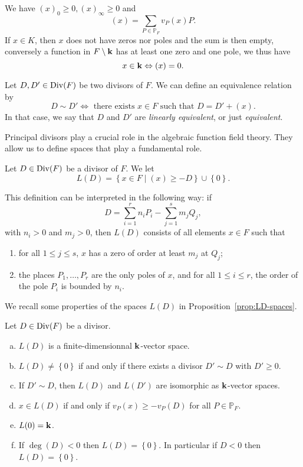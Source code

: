 We have $(x)_0\geq0, (x)_\infty\geq0$ and
\[
  (x) = \sum_{P\in\mathbb{P}_F}v_P(x)P.
\]
If $x\in K$, then $x$ does not have zeros nor poles and the sum is then empty,
conversely a function in $F\setminus\mathbf{k}$ has at least one zero and one pole, we
thus have
\[
  x\in\mathbf{k}\Leftrightarrow (x)=0.
\]
\begin{defi}[Equivalence]
  Let $D, D'\in\operatorname{Div}(F)$ be two divisors of $F$. We can define an equivalence
  relation by
  \[
    D\sim D'\Longleftrightarrow\text{ there exists }x\in F\text{ such that }D =
    D'+(x).
  \]
  In that case, we say that $D$ and $D'$ are \emph{linearly equivalent}, or just
  \emph{equivalent}.
\end{defi}
Principal divisors play a crucial role in the algebraic function field theory.
They allow us to define spaces that play a fundamental role.
\begin{defi}
  Let $D\in\operatorname{Div}(F)$ be a divisor of $F$. We let
  \[
    L(D) = \left\{ x\in F\mid(x)\geq -D \right\}\cup\left\{ 0 \right\}.
  \]
\end{defi}
This definition can be interpreted in the following way: if
\[
  D = \sum_{i=1}^rn_iP_i - \sum_{j=1}^sm_jQ_j,
\]
with $n_i>0$ and $m_j>0$, then $L(D)$ consists of all elements $x\in F$ such
that
\begin{enumerate}
  \item for all $1\leq j\leq s$, $x$ has a zero of order at least $m_j$ at $Q_j$;
  \item the places $P_1, \dots, P_r$ are the only poles of $x$, and for all
    $1\leq i\leq r$, the order of the pole $P_i$ is bounded by $n_i$.
\end{enumerate}
We recall some properties of the spaces $L(D)$ in
Proposition~\ref{prop:LD-spaces}.
\begin{prop}
  \label{prop:LD-spaces}
 Let $D\in\operatorname{Div}(F)$ be a divisor.
 \begin{enumerate}[(a)]
   \item $L(D)$ is a finite-dimensionnal $\mathbf{k}$-vector space.
   \item $L(D)\neq\left\{ 0 \right\}$ if and only if there exists a divisor
     $D'\sim D$ with $D'\geq0$.
   \item If $D'\sim D$, then $L(D)$ and $L(D')$ are isomorphic as $\mathbf{k}$-vector
     spaces.
   \item $x\in L(D)$ if and only if $v_P(x)\geq - v_P(D)$ for all
     $P\in\mathbb{P}_F$.
   \item $L(0)=\mathbf{k}$.
   \item If $\deg(D)<0$ then $L(D)=\left\{ 0 \right\}$. In particular if $D<0$
     then $L(D)=\left\{ 0 \right\}$.
 \end{enumerate}
\end{prop}
